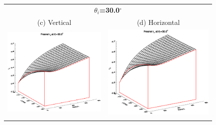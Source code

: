 \begin{figure}[htp]
\begin{tabular}{c c}
    \multicolumn{2}{c}{\boldmath$\theta_i$\unboldmath\sffamily\textbf{=30.0}\boldmath$^\circ$\unboldmath}\\
    \textsf{(c) Vertical} &
    \textsf{(d) Horizontal} \\
    \includegraphics[bb=135 240 508 540,clip,scale=0.5]{graphics/Fresnel/rv_z30.0.eps} &
    \includegraphics[bb=135 240 508 540,clip,scale=0.5]{graphics/Fresnel/rh_z30.0.eps} \\\\


\end{tabular}
\end{figure}
